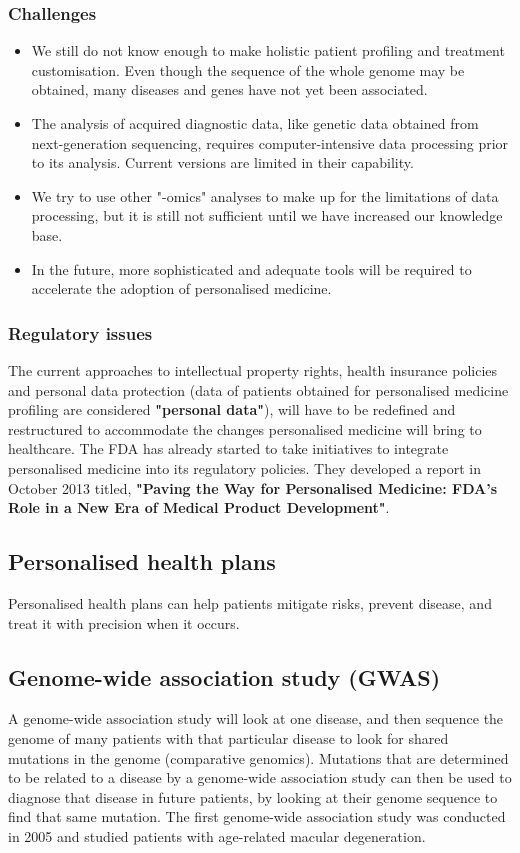 \documentclass[11pt]{article}
\begin{document}
\subsubsection{Challenges}
\label{sec:orgc467393}
\begin{itemize}
\item We still do not know enough to make holistic patient profiling and treatment customisation. Even though the sequence of the whole genome may be obtained, many diseases and genes have not yet been associated.
\item The analysis of acquired diagnostic data, like genetic data obtained from next-generation sequencing, requires computer-intensive data processing prior to its analysis. Current versions are limited in their capability.
\item We try to use other "-omics" analyses to make up for the limitations of data processing, but it is still not sufficient until we have increased our knowledge base.
\item In the future, more sophisticated and adequate tools will be required to accelerate the adoption of personalised medicine.
\end{itemize}
\subsubsection{Regulatory issues}
\label{sec:org67c7334}
The current approaches to intellectual property rights, health insurance policies and personal data protection (data of patients obtained for personalised medicine profiling are considered \textbf{"personal data"}), will have to be redefined and restructured to accommodate the changes personalised medicine will bring to healthcare.
The FDA has already started to take initiatives to integrate personalised medicine into its regulatory policies. They developed a report in October 2013 titled, \textbf{"Paving the Way for Personalised Medicine: FDA's Role in a New Era of Medical Product Development"}.
\subsection{Personalised health plans}
\label{sec:orge09e99a}
Personalised health plans can help patients mitigate risks, prevent disease, and treat it with precision when it occurs.

\newpage
\subsection{Genome-wide association study (GWAS)}
\label{sec:org1c5623e}
A genome-wide association study will look at one disease, and then sequence the genome of many patients with that particular disease to look for shared mutations in the genome (comparative genomics). Mutations that are determined to be related to a disease by a genome-wide association study can then be used to diagnose that disease in future patients, by looking at their genome sequence to find that same mutation. The first genome-wide association study was conducted in 2005 and studied patients with age-related macular degeneration.
\end{document}
